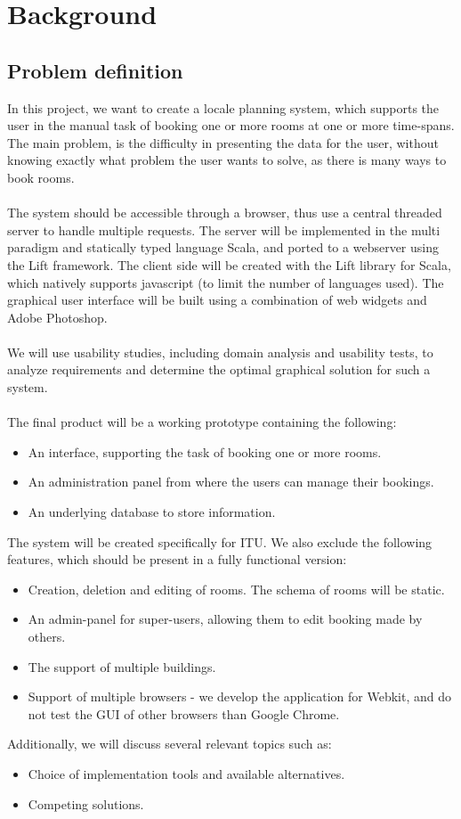 \chapter{Background}{
\section{Problem definition}
In this project, we want to create a locale planning system, which supports the user in the manual task of booking one or more rooms at one or more time-spans. The main problem, is the difficulty in presenting the data for the user, without knowing exactly what problem the user wants to solve, as there is many ways to book rooms. \\
\\
The system should be accessible through a browser, thus use a central threaded server to handle multiple requests. The server will be implemented in the multi paradigm and statically typed language Scala, and ported to a webserver using the Lift framework. The client side will be created with the Lift library for Scala, which natively supports javascript (to limit the number of languages used). The graphical user interface will be built using a combination of web widgets and Adobe Photoshop. \\
\\
We will use usability studies, including domain analysis and usability tests, to analyze requirements and determine the optimal graphical solution for such a system. \\
\\
The final product will be a working prototype containing the following: 
\begin{itemize}
\item An interface, supporting the task of booking one or more rooms.
\item An administration panel from where the users can manage their bookings. 
\item An underlying database to store information.
\end{itemize}


\noindent The system will be created specifically for ITU. We also exclude the following features, which should be present in a fully functional version: 
\begin{itemize}
\item Creation, deletion and editing of rooms. The schema of rooms will be static. 
\item An admin-panel for super-users, allowing them to edit booking made by others. 
\item The support of multiple buildings. 
\item Support of multiple browsers - we develop the application for Webkit, and do not test the GUI of other browsers than Google Chrome. 
\end{itemize}
Additionally, we will discuss several relevant topics such as: 
\begin{itemize}
\item Choice of implementation tools and available alternatives. 
\item Competing solutions. 
\end{itemize}



}

